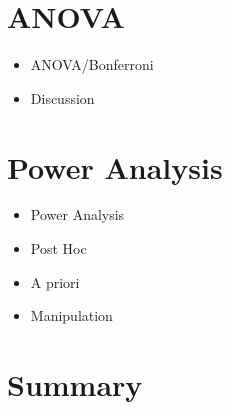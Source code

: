 \documentclass[svgnames,smaller]{beamer}
\begin{document}
		
		
\section{ANOVA}

\begin{frame}
	\begin{itemize}\pause
		\item ANOVA/Bonferroni\pause
		\item Discussion
	\end{itemize}
\end{frame}
\section{Power Analysis}

\begin{frame}
	\begin{itemize}\pause
		\item Power Analysis\pause
		\item Post Hoc\pause
		\item A priori\pause
		\item Manipulation
	\end{itemize}
\end{frame}
\section*{Summary}
\end{document}
